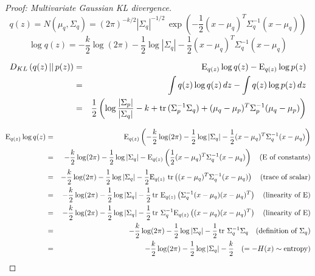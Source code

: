 \begin{proof}[Proof: Multivariate Gaussian KL divergence]

\begin{equation}
q(z) = N(\mu_q, \Sigma_q) = (2 \pi)^{-k/2} |\Sigma_q|^{-1/2} \, \exp\left(-\frac{1}{2} (x - \mu_q)^T \Sigma_q^{-1} (x - \mu_q)\right)
\end{equation}
\begin{equation}
\log q(z) = -\frac{k}{2} \log(2 \pi) -\frac{1}{2} \log|\Sigma_q| -\frac{1}{2} (x - \mu_q)^T \Sigma_q^{-1} (x - \mu_q)
\end{equation}

\begin{eqnarray}
D_{KL}\left( q(z) \, || \, p(z)\right) 
& = & \mathrm{E}_{q(z)} \log q(z) - \mathrm{E}_{q(z)} \log p(z) \nonumber \\
& = & \int q(z) \log q(z) \, dz - \int q(z) \log p(z) \, dz \nonumber \\
& = & \frac{1}{2} \left( \log \frac{|\Sigma_p|}{|\Sigma_q|} - k + \operatorname{tr} \, (\Sigma_p^{-1} \Sigma_q) + (\mu_q - \mu_p)^T \Sigma_p^{-1} (\mu_q - \mu_p) \right)
\end{eqnarray}

\begin{eqnarray}
\mathrm{E}_{q(z)} \log q(z)
& = &
\mathrm{E}_{q(z)} \left( -\frac{k}{2} \log(2 \pi) -\frac{1}{2} \log|\Sigma_q|  -\frac{1}{2} (x - \mu_q)^T \Sigma_q^{-1} (x - \mu_q) \right) \nonumber \\
& = &
-\frac{k}{2} \log(2 \pi) -\frac{1}{2} \log|\Sigma_q| - \mathrm{E}_{q(z)} \left( \frac{1}{2} (x - \mu_q)^T \Sigma_q^{-1} (x - \mu_q) \right) \quad (\mathrm{E} \text{ of constants)} \nonumber \\
& = &
-\frac{k}{2} \log(2 \pi) -\frac{1}{2} \log|\Sigma_q| - \frac{1}{2} \mathrm{E}_{q(z)} \, \operatorname{tr} \left( (x - \mu_q)^T \Sigma_q^{-1} (x - \mu_q) \right) \quad \text{(trace of scalar)} \nonumber \\
& = &
-\frac{k}{2} \log(2 \pi) -\frac{1}{2} \log|\Sigma_q| - \frac{1}{2} \operatorname{tr} \, \mathrm{E}_{q(z)} \left( \Sigma_q^{-1} (x - \mu_q) (x - \mu_q)^T \right) \quad \text{(linearity of } \mathrm{E}) \nonumber \\
& = &
-\frac{k}{2} \log(2 \pi) -\frac{1}{2} \log|\Sigma_q| - \frac{1}{2} \operatorname{tr} \, \Sigma_q^{-1} \mathrm{E}_{q(z)} \left( (x - \mu_q) (x - \mu_q)^T \right) \quad \text{(linearity of } \mathrm{E}) \nonumber \\
& = &
-\frac{k}{2} \log(2 \pi) -\frac{1}{2} \log|\Sigma_q| - \frac{1}{2} \operatorname{tr} \, \Sigma_q^{-1} \Sigma_q \quad \text{(definition of } \Sigma_q) \nonumber \\
& = &
-\frac{k}{2} \log(2 \pi) -\frac{1}{2} \log|\Sigma_q| - \frac{k}{2} \quad (= -H(x) \sim \text{entropy})
\end{eqnarray}



\end{proof}
